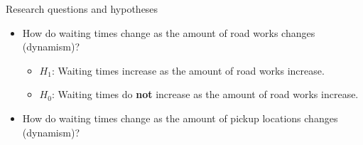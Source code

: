 \begin{frame}[allowframebreaks]{Research questions and hypotheses}
\begin{itemize}
        \item How do waiting times change as the amount of road works changes (dynamism)?
        \begin{itemize}
            \item $H_1$: Waiting times increase as the amount of road works increase.
            \item $H_0$: Waiting times do \textbf{not} increase as the amount of road works increase.
        \end{itemize}

    \item How do waiting times change as the amount of pickup locations changes (dynamism)?
    \end{itemize}
\end{frame}
